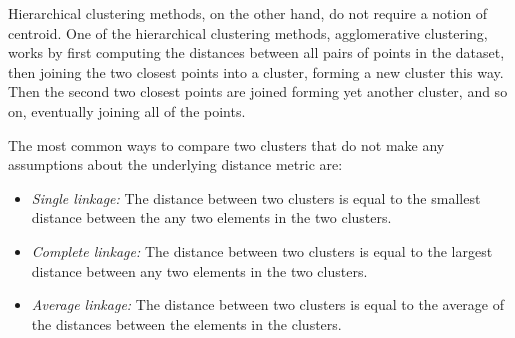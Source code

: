 \documentclass[parskip]{cs4rep}
\begin{document}
Hierarchical clustering methods, on the other hand, do not require a notion of centroid. One of the hierarchical clustering methods, agglomerative clustering, works by first computing the distances between all pairs of points in the dataset, then joining the two closest points into a cluster, forming a new cluster this way. Then the second two closest points are joined forming yet another cluster, and so on, eventually joining all of the points. 

The most common ways to compare two clusters that do not make any assumptions about the underlying distance metric are: 

\begin{itemize}
   \item \emph{Single linkage:} The distance between two clusters is equal to the smallest distance between the any two elements in the two clusters.
   \item \emph{Complete linkage:} The distance between two clusters is equal to the largest distance between any two elements in the two clusters.
   \item \emph{Average linkage:} The distance between two clusters is equal to the average of the distances between the elements in the clusters.
\end{itemize}
\end{document}
